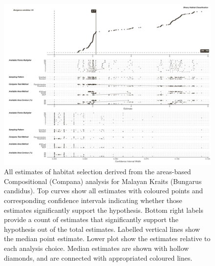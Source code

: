 \documentclass[10pt,a4paper]{article}
\begin{document}
\begin{figure}
\includegraphics[width=1\linewidth]{../../figures/specCurve_Bungarus candidus_area} \caption{All estimates of habitat selection derived from the areas-based Compositional (Compana) analysis for Malayan Kraits (Bungarus candidus). Top curves show all estimates with coloured points and corresponding confidence intervals indicating whether those estimates significantly support the hypothesis. Bottom right labels provide a count of estimates that significantly support the hypothesis out of the total estimates. Labelled vertical lines show the median point estimate. Lower plot show the estimates relative to each analysis choice. Median estimates are shown with hollow diamonds, and are connected with appropriated coloured lines.}\label{fig:specCurveAreaBUCA}
\end{figure}
\end{document}
